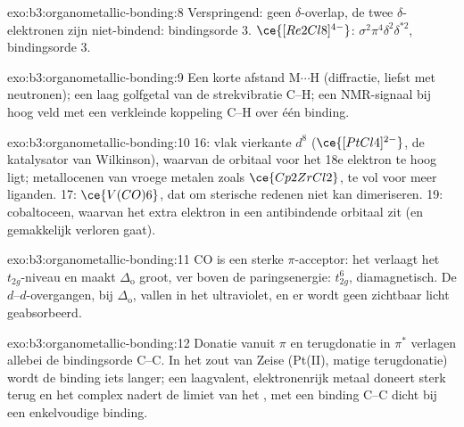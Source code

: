 \begin{solution}{exo:b3:organometallic-bonding:8}
Verspringend: geen $\delta$-overlap, de twee $\delta$-elektronen zijn niet-bindend: bindingsorde 3. $\ce{[Re2Cl8]^{4-}}$:
$\sigma^2\pi^4\delta^2\delta^{\ast2}$, bindingsorde 3.
\end{solution}

\begin{solution}{exo:b3:organometallic-bonding:9}
Een korte afstand M$\cdots$H (diffractie, liefst met neutronen); een laag
golfgetal van de strekvibratie C--H; een NMR-signaal bij hoog veld met
een verkleinde koppeling C--H over één binding.
\end{solution}

\begin{solution}{exo:b3:organometallic-bonding:10}
16: vlak vierkante $d^8$ ($\ce{[PtCl4]^{2-}}$, de katalysator van Wilkinson), waarvan de orbitaal voor het 18e elektron
te hoog ligt; metallocenen van vroege metalen zoals $\ce{Cp2ZrCl2}$, te vol voor meer
liganden. 17: $\ce{V(CO)6}$, dat om sterische redenen niet kan dimeriseren. 19: cobaltoceen,
waarvan het extra elektron in een antibindende orbitaal zit (en
gemakkelijk verloren gaat).
\end{solution}

\begin{solution}{exo:b3:organometallic-bonding:11}
CO is een sterke $\pi$-acceptor: het verlaagt het $t_{2g}$-niveau en maakt $\Delta_{\mathrm o}$ groot, ver boven de
paringsenergie: $t_{2g}^6$, diamagnetisch. De $d$--$d$-overgangen, bij $\Delta_{\mathrm o}$, vallen in het ultraviolet,
en er wordt geen zichtbaar licht geabsorbeerd.
\end{solution}

\begin{solution}{exo:b3:organometallic-bonding:12}
Donatie vanuit $\pi$ en terugdonatie in $\pi^*$ verlagen allebei de bindingsorde C--C. In het zout
van Zeise (Pt(II), matige terugdonatie) wordt de binding iets langer; een
laagvalent, elektronenrijk metaal doneert sterk terug en het complex
nadert de limiet van het , met een binding C--C dicht
bij een enkelvoudige binding.
\end{solution}

